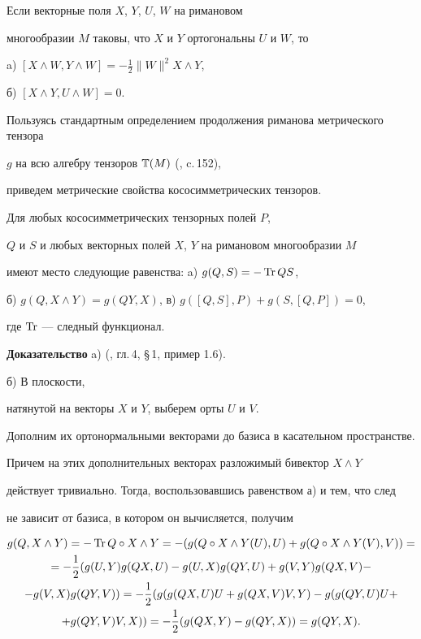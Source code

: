 \begin{cors} Если векторные поля $X$, $Y$, $U$, $W$ на римановом


многообразии $M$ таковы, что $X$ и $Y$ ортогональны $U$ и $W$, то





a) $[X\land W,Y\land W]=-\frac12\| W\| ^2X\land Y$,


\qquad


б) $[X\land Y,U\land W]=0$.


\end{cors}





Пользуясь стандартным определением продолжения риманова метрического тензора


$g$ на всю алгебру тензоров $\Bbb T (M)$ (\cite{Kob1}, c.\,152),


приведем метрические свойства кососимметрических тензоров.





\begin{props} Для любых кососимметрических тензорных полей $P$,


$Q$ и $S$ и любых векторных полей $X$, $Y$ на римановом многообразии $M$


имеют место следующие равенства: {\rm{a)}} $g(Q,S)=-\operatorname{Tr} QS$,


{\rm{б)}} $g(Q,X\land Y)=g(QY,X)$, {\rm{в)}} $g([Q,S],P)+g(S,[Q,P])=0$,


где $\operatorname{Tr}$ --- следный функционал.


\end{props}





{\bf Доказательство} a) (\cite{Kob1}, гл.\,4, \S\,1, пример 1.6).


б) В плоскости,


натянутой на векторы $X$ и $Y$, выберем орты $U$ и $V$.


Дополним их ортонормальными векторами до базиса в касательном пространстве.


Причем на этих дополнительных векторах разложимый бивектор $X\land Y$


действует тривиально. Тогда, воспользовавшись равенством а) и тем, что след


не зависит от базиса, в котором он вычисляется, получим


\begin{gather*}


g(Q,X\land Y)=-\Tr Q\circ X\land Y= -(g(Q\circ X\land Y(U),U)+g(Q\circ X


\land Y(V),V))=\\


=-\frac12 (g(U,Y)g(QX,U)-g(U,X)g(QY,U)+g(V,Y)g(QX,V)-\\


-g(V,X)g(QY,V))=-\frac12 (g(g(QX,U)U+g(QX,V)V,Y)-g(g(QY,U)U+\\


+g(QY,V)V,X))=-\frac12(g(QX,Y)-g(QY,X))=g(QY,X).


\end{gather*}


